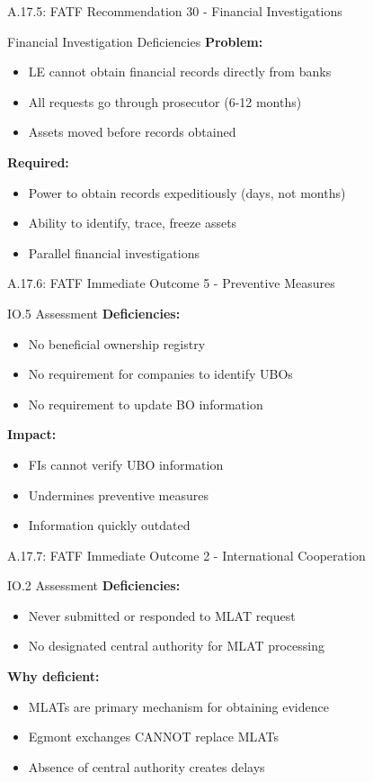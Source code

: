 \documentclass{beamer}
\begin{document}
\begin{frame}{A.17.5: FATF Recommendation 30 - Financial Investigations}
	\begin{block}{Financial Investigation Deficiencies}
		\textbf{Problem:}
		\begin{itemize}
			\item LE cannot obtain financial records directly from banks
			\item All requests go through prosecutor (6-12 months)
			\item Assets moved before records obtained
		\end{itemize}
		\textbf{Required:}
		\begin{itemize}
			\item Power to obtain records expeditiously (days, not months)
			\item Ability to identify, trace, freeze assets
			\item Parallel financial investigations
		\end{itemize}
	\end{block}
\end{frame}

\begin{frame}{A.17.6: FATF Immediate Outcome 5 - Preventive Measures}
	\begin{block}{IO.5 Assessment}
		\textbf{Deficiencies:}
		\begin{itemize}
			\item No beneficial ownership registry
			\item No requirement for companies to identify UBOs
			\item No requirement to update BO information
		\end{itemize}
		\textbf{Impact:}
		\begin{itemize}
			\item FIs cannot verify UBO information
			\item Undermines preventive measures
			\item Information quickly outdated
		\end{itemize}
	\end{block}
\end{frame}

\begin{frame}{A.17.7: FATF Immediate Outcome 2 - International Cooperation}
	\begin{block}{IO.2 Assessment}
		\textbf{Deficiencies:}
		\begin{itemize}
			\item Never submitted or responded to MLAT request
			\item No designated central authority for MLAT processing
		\end{itemize}
		\textbf{Why deficient:}
		\begin{itemize}
			\item MLATs are primary mechanism for obtaining evidence
			\item Egmont exchanges CANNOT replace MLATs
			\item Absence of central authority creates delays
		\end{itemize}
	\end{block}
\end{frame}
\end{document}
